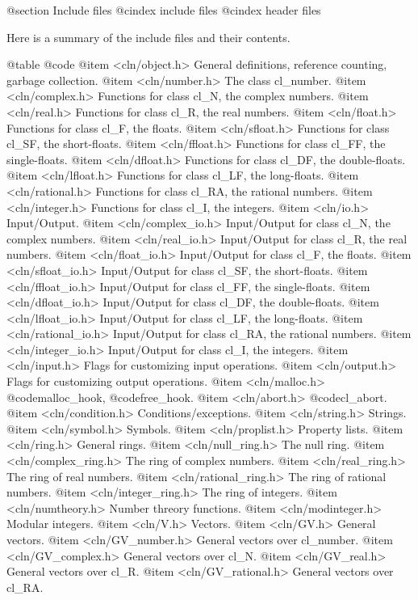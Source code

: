 @section Include files
@cindex include files
@cindex header files

Here is a summary of the include files and their contents.

@table @code
@item <cln/object.h>
General definitions, reference counting, garbage collection.
@item <cln/number.h>
The class cl_number.
@item <cln/complex.h>
Functions for class cl_N, the complex numbers.
@item <cln/real.h>
Functions for class cl_R, the real numbers.
@item <cln/float.h>
Functions for class cl_F, the floats.
@item <cln/sfloat.h>
Functions for class cl_SF, the short-floats.
@item <cln/ffloat.h>
Functions for class cl_FF, the single-floats.
@item <cln/dfloat.h>
Functions for class cl_DF, the double-floats.
@item <cln/lfloat.h>
Functions for class cl_LF, the long-floats.
@item <cln/rational.h>
Functions for class cl_RA, the rational numbers.
@item <cln/integer.h>
Functions for class cl_I, the integers.
@item <cln/io.h>
Input/Output.
@item <cln/complex_io.h>
Input/Output for class cl_N, the complex numbers.
@item <cln/real_io.h>
Input/Output for class cl_R, the real numbers.
@item <cln/float_io.h>
Input/Output for class cl_F, the floats.
@item <cln/sfloat_io.h>
Input/Output for class cl_SF, the short-floats.
@item <cln/ffloat_io.h>
Input/Output for class cl_FF, the single-floats.
@item <cln/dfloat_io.h>
Input/Output for class cl_DF, the double-floats.
@item <cln/lfloat_io.h>
Input/Output for class cl_LF, the long-floats.
@item <cln/rational_io.h>
Input/Output for class cl_RA, the rational numbers.
@item <cln/integer_io.h>
Input/Output for class cl_I, the integers.
@item <cln/input.h>
Flags for customizing input operations.
@item <cln/output.h>
Flags for customizing output operations.
@item <cln/malloc.h>
@code{malloc_hook}, @code{free_hook}.
@item <cln/abort.h>
@code{cl_abort}.
@item <cln/condition.h>
Conditions/exceptions.
@item <cln/string.h>
Strings.
@item <cln/symbol.h>
Symbols.
@item <cln/proplist.h>
Property lists.
@item <cln/ring.h>
General rings.
@item <cln/null_ring.h>
The null ring.
@item <cln/complex_ring.h>
The ring of complex numbers.
@item <cln/real_ring.h>
The ring of real numbers.
@item <cln/rational_ring.h>
The ring of rational numbers.
@item <cln/integer_ring.h>
The ring of integers.
@item <cln/numtheory.h>
Number threory functions.
@item <cln/modinteger.h>
Modular integers.
@item <cln/V.h>
Vectors.
@item <cln/GV.h>
General vectors.
@item <cln/GV_number.h>
General vectors over cl_number.
@item <cln/GV_complex.h>
General vectors over cl_N.
@item <cln/GV_real.h>
General vectors over cl_R.
@item <cln/GV_rational.h>
General vectors over cl_RA.
